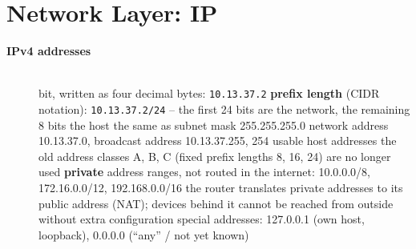 \section{Network Layer: IP}

\begin{description}
\item[{\rot\bf IPv4 addresses}]~\\[-\lblskip]
\bi
	 bit, written as four decimal bytes: \texttt{10.13.37.2}
	\ite \textbf{prefix length} (CIDR notation): \texttt{10.13.37.2/24} -- the first 24 bits are the network, the remaining 8 bits the host
	\bi
		\ite the same as subnet mask 255.255.255.0
		\ite network address 10.13.37.0, broadcast address 10.13.37.255, 254 usable host addresses
	\ei
	\ite the old address classes A, B, C (fixed prefix lengths 8, 16, 24) are no longer used
	\ite \textbf{private} address ranges, not routed in the internet: 10.0.0.0/8, 172.16.0.0/12, 192.168.0.0/16
	\bi
		\ite the router translates private addresses to its public address (NAT); devices behind it cannot be reached from outside without extra configuration
	\ei
	\ite special addresses: 127.0.0.1 (own host, loopback), 0.0.0.0 (``any'' / not yet known)
\ei
\os{\newpage}


\end{description}
